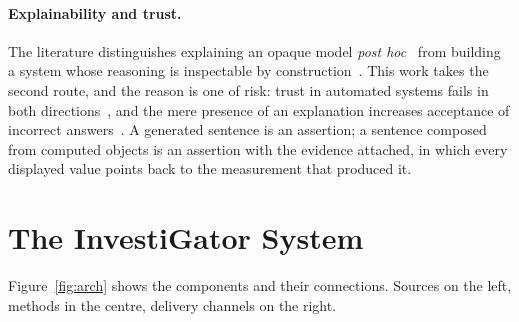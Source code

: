 \documentclass[runningheads]{llncs}
\begin{document}
\paragraph{Explainability and trust.} The literature distinguishes explaining an opaque
model \emph{post hoc}~\cite{ribeiro2016lime,lundberg2017shap} from building a system whose
reasoning is inspectable by construction~\cite{rudin2019stop}. This work takes the second
route, and the reason is one of risk: trust in automated systems fails in both
directions~\cite{lee2004trust}, and the mere presence of an explanation increases
acceptance of incorrect answers~\cite{bansal2021whole}. A generated sentence is an
assertion; a sentence composed from computed objects is an assertion with the evidence
attached, in which every displayed value points back to the measurement that produced it.

\section{The InvestiGator System}
\label{sec:system}

Figure~\ref{fig:arch} shows the components and their connections. Sources on the left,
methods in the centre, delivery channels on the right.
\end{document}
